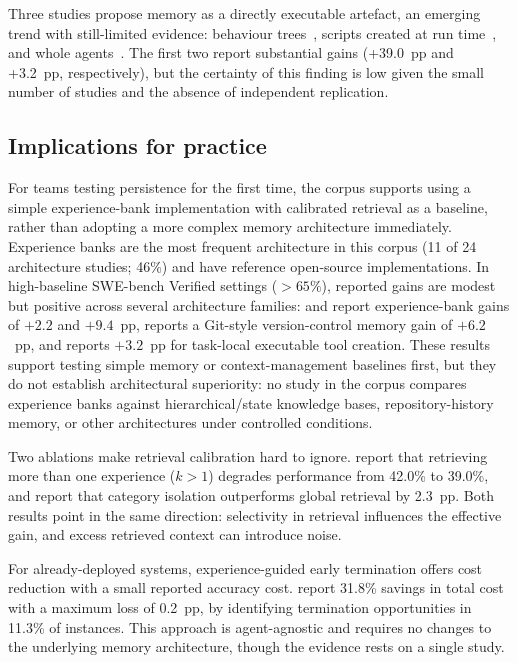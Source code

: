 Three studies propose memory as a directly executable artefact, an
emerging trend with still-limited evidence:
behaviour trees~\citep{li2026traversalaspolicy},
scripts created at run time~\citep{xia2025livesweagent}, and
whole agents~\citep{zhang2025darwingodel}.
The first two report substantial gains (+39.0~pp and +3.2~pp,
respectively), but the certainty of this finding is low given the
small number of studies and the absence of independent replication.

\subsection{Implications for practice}
\label{sec:implicacoes-pratica}

For teams testing persistence for the first time, the corpus supports
using a simple experience-bank implementation with calibrated retrieval
as a baseline, rather than adopting a more complex memory architecture
immediately.
Experience banks are the most frequent architecture in this corpus
(11 of 24 architecture studies; 46\%) and have reference open-source
implementations.
In high-baseline SWE-bench Verified settings ($>65\%$), reported gains
are modest but positive across several architecture families:
\citet{chen2025sweexp} and \citet{deng2026memcoder} report
experience-bank gains of $+2.2$ and $+9.4$~pp,
\citet{wu2025gcc} reports a Git-style version-control memory gain of
$+6.2$~pp, and \citet{xia2025livesweagent} reports $+3.2$~pp for
task-local executable tool creation.
These results support testing simple memory or context-management
baselines first, but they do not establish architectural superiority:
no study in the corpus compares experience banks against
hierarchical/state knowledge bases, repository-history memory, or other
architectures under controlled conditions.

Two ablations make retrieval calibration hard to ignore.
\citet{chen2025sweexp} report that retrieving more than one experience
($k > 1$) degrades performance from 42.0\% to 39.0\%, and
\citet{shen2026structurally} report that category isolation outperforms
global retrieval by 2.3~pp.
Both results point in the same direction: selectivity in retrieval
influences the effective gain, and excess retrieved context can
introduce noise.

For already-deployed systems, experience-guided early termination
offers cost reduction with a small reported accuracy cost.
\citet{guo2026eet} report 31.8\% savings in total cost with a maximum
loss of 0.2~pp, by identifying termination opportunities in 11.3\% of
instances.
This approach is agent-agnostic and requires no changes to the
underlying memory architecture, though the evidence rests on a single
study.


